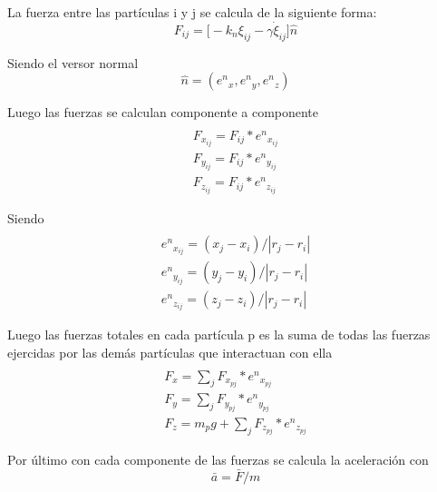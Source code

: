 \documentclass{article}
\begin{document}
La fuerza entre las partículas i y j se calcula de la siguiente forma:
\begin{equation}
    \label{Force equation}
    F_{ij} = \Big[-k_n\xi_{ij} - \gamma \dot{\xi}_{ij}\Big] \hat{n}
\end{equation}

Siendo el versor normal
\begin{equation}
    \hat{n} = ({e^n}_x, {e^n}_y, {e^n}_z)
\end{equation}

Luego las fuerzas se calculan componente a componente
\begin{equation}
  \begin{aligned}
    \\F_{x_{ij}} = F_{ij} * {e^n}_{x_{ij}}
    \\F_{y_{ij}} = F_{ij} * {e^n}_{y_{ij}}
    \\F_{z_{ij}} = F_{ij} * {e^n}_{z_{ij}}
    \end{aligned}
\end{equation}

Siendo
\begin{equation}
  \begin{aligned}
    \\{e^n}_{x_{ij}} = (x_j - x_i) / \left | r_j - r_i \right |
    \\{e^n}_{y_{ij}} = (y_j - y_i) / \left | r_j - r_i \right |
    \\{e^n}_{z_{ij}} = (z_j - z_i) / \left | r_j - r_i \right |
  \end{aligned}
\end{equation}

Luego las fuerzas totales en cada partícula p es la suma de todas las fuerzas ejercidas por las demás partículas que interactuan con ella
\begin{equation}
  \begin{aligned}
    \\F_x = \sum_{j}F_{x_{pj}} * {e^n}_{x_{pj}}
    \\F_y = \sum_{j}F_{y_{pj}} * {e^n}_{y_{pj}}
    \\F_z = m_pg + \sum_{j}F_{z_{pj}} * {e^n}_{z_{pj}}
  \end{aligned}
\end{equation}

Por último con cada componente de las fuerzas se calcula la aceleración con
\begin{equation}
\bar{a}=\bar{F}/m
\end{equation}
\end{document}
